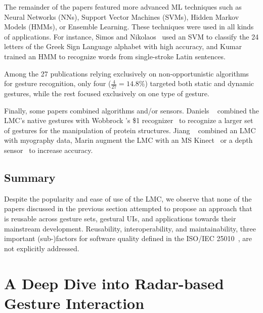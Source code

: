 The remainder of the papers featured more advanced ML techniques such as Neural Networks (NNs), Support Vector Machines (SVMs), Hidden Markov Models (HMMs), or Ensemble Learning. These techniques were used in all kinds of applications. For instance, Simos and Nikolaos~\cite{Simos:2016} used an SVM to classify the 24 letters of the Greek Sign Language alphabet with high accuracy, and Kumar \etal~\cite{Kumar:2017a} trained an HMM to recognize words from single-stroke Latin sentences.

Among the 27 publications relying exclusively on non-opportunistic algorithms for gesture recognition, only four ($\frac{4}{27}{=}14.8\%$) targeted both static and dynamic gestures, while the rest focused exclusively on one type of gesture.

Finally, some papers combined algorithms and/or sensors. Daniels \etal~\cite{Daniels:2014} combined the LMC's native gestures with Wobbrock \etal's \$1 recognizer~\cite{Wobbrock:2007} to recognize a larger set of gestures for the manipulation of protein structures. Jiang \etal~\cite{Jiang:2018} combined an LMC with myography data, Marin \etal augment the LMC with an MS Kinect~\cite{Marin:2014} or a depth sensor~\cite{Marin:2016} to increase accuracy. 

\subsection{Summary} \label{sec:state_of_the_art:lmc:summary}
Despite the popularity and ease of use of the LMC, we observe that none of the papers discussed in the previous section attempted to propose an approach that is reusable across gesture sets, gestural UIs, and applications towards their mainstream development. Reusability, interoperability, and maintainability, three important (sub-)factors for software quality defined in the ISO/IEC 25010~\cite{iso25010}, are not explicitly addressed.


\section{A Deep Dive into Radar-based Gesture Interaction} \label{sec:state_of_the_art:radar}

